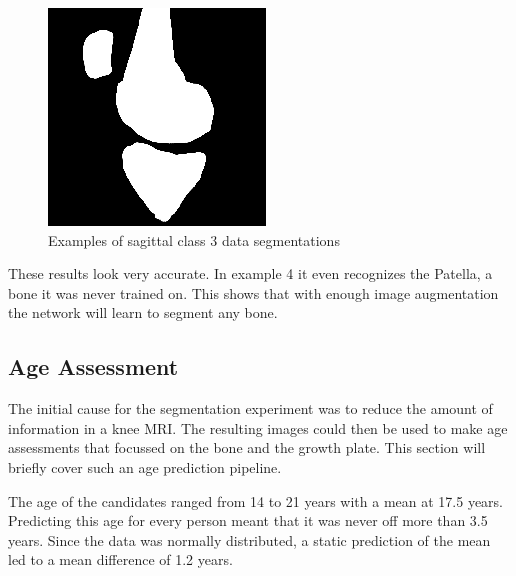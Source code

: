 \begin{figure}[H]
\endminipage\hfill
{}%
  \includegraphics[width=\linewidth]{imgs/transfer_pers_y4.png}
\endminipage
\caption{Examples of sagittal class 3 data segmentations}
\end{figure}

These results look very accurate. In example 4 it even recognizes the Patella, a bone it was never trained on. This shows that with enough image augmentation the network will learn to segment any bone.

\subsection{Age Assessment}

The initial cause for the segmentation experiment was to reduce the amount of information in a knee MRI. The resulting images could then be used to make age assessments that focussed on the bone and the growth plate. This section will briefly cover such an age prediction pipeline.

The age of the candidates ranged from 14 to 21 years with a mean at 17.5 years. Predicting this age for every person meant that it was never off more than 3.5 years. Since the data was normally distributed, a static prediction of the mean led to a mean difference of 1.2 years.


